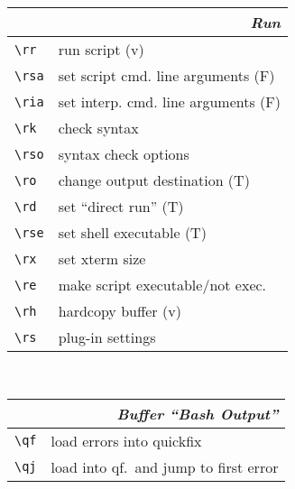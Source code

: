\documentclass[oneside,11pt,landscape,DIV16]{scrartcl}
\begin{document}
\begin{multicols}{3}
\begin{center}
\begin{tabular}[]{|p{11mm}|p{60mm}|}
\hline
\multicolumn{2}{|r|}{\textsl{\textbf{R}un}} \\[1.0ex]
\hline \verb'\rr'  & run script                           \hfill (v)\\
\hline \verb'\rsa' & set script cmd. line arguments       \hfill (F)\\
\hline \verb'\ria' & set interp. cmd. line arguments      \hfill (F)\\
\hline \verb'\rk'  & check syntax                         \\
\hline \verb'\rso' & syntax check options                 \\
\hline \verb'\ro'  & change output destination            \hfill (T)\\
\hline \verb'\rd'  & set ``direct run''                   \hfill (T)\\
\hline \verb'\rse' & set shell executable                 \hfill (T)\\
\hline \verb'\rx'  & set xterm size                       \\
\hline \verb'\re'  & make script executable/not exec.     \\
\hline \verb'\rh'  & hardcopy buffer                      \hfill (v)\\
\hline \verb'\rs'  & plug-in settings                     \\
\hline
\end{tabular}\\
%
\newpage
%
%
\begin{tabular}[]{|p{11mm}|p{60mm}|}
\hline
\multicolumn{2}{|r|}{\textsl{Buffer ``Bash Output''}} \\[1.0ex]
\hline \verb'\qf'  & load errors into quickfix             \\
\hline \verb'\qj'  & load into qf.~and jump to first error \\
\hline
\end{tabular}\\[2.5ex]
%
\parbox[t][72mm][t]{69mm}{%
%
}
\end{center}
\end{multicols}
\end{document}
